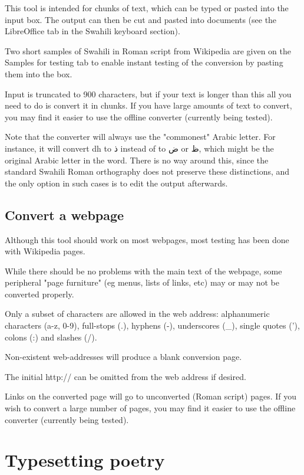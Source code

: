 \documentclass[a4paper,10pt]{article}
\begin{document}
This tool is intended for chunks of text, which can be typed or pasted into the input box. The output can then be cut and pasted into documents (see the LibreOffice tab in the Swahili keyboard section).

Two short samples of Swahili in Roman script from Wikipedia are given on the Samples for testing tab to enable instant testing of the conversion by pasting them into the box.

Input is truncated to 900 characters, but if your text is longer than this all you need to do is convert it in chunks. If you have large amounts of text to convert, you may find it easier to use the offline converter (currently being tested).

Note that the converter will always use the "commonest" Arabic letter. For instance, it will convert dh to ذ instead of to ض or ظ, which might be the original Arabic letter in the word. There is no way around this, since the standard Swahili Roman orthography does not preserve these distinctions, and the only option in such cases is to edit the output afterwards.

\subsection{Convert a webpage}

Although this tool should work on most webpages, most testing has been done with Wikipedia pages.

While there should be no problems with the main text of the webpage, some peripheral "page furniture" (eg menus, lists of links, etc) may or may not be converted properly.

Only a subset of characters are allowed in the web address: alphanumeric characters (a-z, 0-9), full-stops (.), hyphens (-), underscores (\_), single quotes ('), colons (:) and slashes (/).

Non-existent web-addresses will produce a blank conversion page.

The initial http:// can be omitted from the web address if desired.

Links on the converted page will go to unconverted (Roman script) pages. If you wish to convert a large number of pages, you may find it easier to use the offline converter (currently being tested).


\section{Typesetting poetry}
\end{document}
